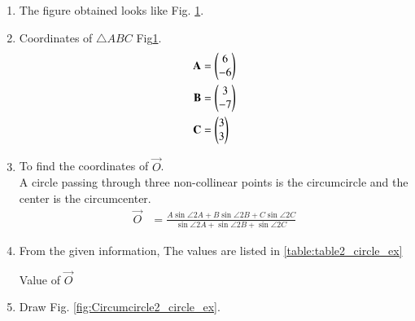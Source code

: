 \renewcommand{\theequation}{\theenumi}
\begin{enumerate}[label=\thesubsection.\arabic*.,ref=\thesubsection.\theenumi]

\begin{figure}[!ht]
\centering
\resizebox{\columnwidth}{!}{}
\caption{Circumcircle by Latex-Tikz}
\label{fig:Circumcircle_circle_ex}	
\end{figure}

\item The figure obtained looks like Fig. \ref{fig:Circumcircle_circle_ex}.\\ 

\item Coordinates of $\triangle ABC$ Fig\ref{fig:Circumcircle_circle_ex}. \\
\begin{align}
\mathbf{A} &=\begin{pmatrix}6\\-6\end{pmatrix} \label{eq:constr_a_circle_ex}\\
\mathbf{B} &=\begin{pmatrix}3\\-7\end{pmatrix} \label{eq:constr_b_circle_ex}\\
\mathbf{C} &=\begin{pmatrix}3\\3\end{pmatrix} \label{eq:constr_c_circle_ex}
\end{align}

\item To find the coordinates of $\vec{O}$. \\
\solution A circle passing through three non-collinear points is the circumcircle and the center is the circumcenter.\\
\begin{align}
\vec{O} &= \frac{A\sin{\angle 2A} + B\sin{\angle 2B} + C\sin{\angle 2C}}{\sin{\angle 2A} + \sin{\angle 2B} + \sin{\angle 2C}}
\end{align}

\item
From the given information, 
The values are listed in \ref{table:table2_circle_ex}\\
\begin{table}[ht!]
\centering

\caption{Value of $\vec{O}$}
\label{table:table2_circle_ex}	
\end{table} 

\pagebreak
\item Draw Fig. \ref{fig:Circumcircle2_circle_ex}.


\end{enumerate}
